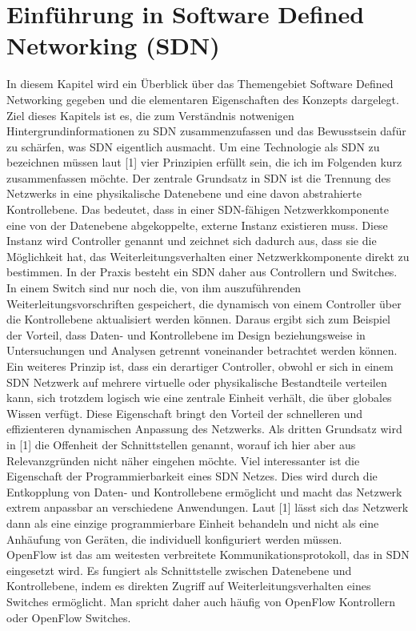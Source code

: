 \documentclass[conference]{IEEEtran}
\begin{document}


\section{Einführung in Software Defined Networking (SDN)}

In diesem Kapitel wird ein Überblick über das Themengebiet Software Defined Networking gegeben und die elementaren Eigenschaften des Konzepts dargelegt. Ziel dieses Kapitels ist es, die zum Verständnis notwenigen Hintergrundinformationen zu SDN zusammenzufassen und das Bewusstsein dafür zu schärfen, was SDN eigentlich ausmacht.  Um eine Technologie als SDN zu bezeichnen müssen laut [1] vier Prinzipien erfüllt sein, die ich im Folgenden kurz zusammenfassen möchte. Der zentrale Grundsatz in SDN ist die Trennung des Netzwerks in eine physikalische Datenebene und eine davon abstrahierte Kontrollebene. Das bedeutet, dass in einer SDN-fähigen Netzwerkkomponente eine von der Datenebene abgekoppelte, externe Instanz existieren muss. Diese Instanz wird Controller genannt und zeichnet sich dadurch aus, dass sie die Möglichkeit hat, das Weiterleitungsverhalten einer Netzwerkkomponente direkt zu bestimmen. In der Praxis besteht ein SDN daher aus Controllern und Switches. In einem Switch sind nur noch die, von ihm auszuführenden Weiterleitungsvorschriften gespeichert, die dynamisch von einem Controller über die Kontrollebene aktualisiert werden können.  Daraus ergibt sich zum Beispiel der Vorteil, dass Daten- und Kontrollebene im Design beziehungsweise in Untersuchungen und Analysen getrennt voneinander betrachtet werden können. \\
Ein weiteres Prinzip ist, dass ein derartiger Controller, obwohl er sich in einem SDN Netzwerk auf mehrere virtuelle oder physikalische Bestandteile verteilen kann, sich trotzdem logisch wie eine zentrale Einheit verhält, die über globales Wissen verfügt. Diese Eigenschaft bringt den Vorteil der schnelleren und effizienteren dynamischen Anpassung des Netzwerks.
Als dritten Grundsatz wird in [1] die Offenheit der Schnittstellen genannt, worauf ich hier aber aus Relevanzgründen nicht näher eingehen möchte. Viel interessanter ist die Eigenschaft der Programmierbarkeit eines SDN Netzes. Dies wird durch die Entkopplung von Daten- und Kontrollebene ermöglicht und macht das Netzwerk extrem anpassbar an verschiedene Anwendungen. Laut [1] lässt sich das Netzwerk dann als eine einzige programmierbare Einheit behandeln und nicht als eine Anhäufung von Geräten, die individuell konfiguriert werden müssen.\\
OpenFlow ist das am weitesten verbreitete Kommunikationsprotokoll, das in SDN eingesetzt wird. Es fungiert als Schnittstelle zwischen Datenebene und Kontrollebene, indem es direkten Zugriff auf Weiterleitungsverhalten eines Switches ermöglicht. Man spricht daher auch häufig von OpenFlow Kontrollern oder OpenFlow Switches. 
\end{document}

